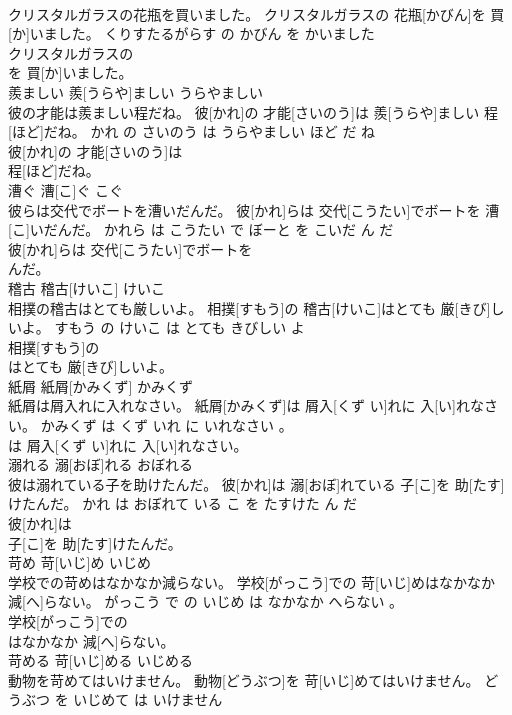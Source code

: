 \documentclass[8pt]{extreport}
\begin{document}
\begin{CJK}{UTF8}{min}
\\	クリスタルガラスの花瓶を買いました。	クリスタルガラスの 花瓶[かびん]を 買[か]いました。	くりすたるがらす の かびん を かいました	
\\	クリスタルガラスの
\\	を 買[か]いました。			
\\	羨ましい	羨[うらや]ましい	うらやましい	
\\	彼の才能は羨ましい程だね。	彼[かれ]の 才能[さいのう]は 羨[うらや]ましい 程[ほど]だね。	かれ の さいのう は うらやましい ほど だ ね	
\\	彼[かれ]の 才能[さいのう]は
\\	程[ほど]だね。			
\\	漕ぐ	漕[こ]ぐ	こぐ	
\\	彼らは交代でボートを漕いだんだ。	彼[かれ]らは 交代[こうたい]でボートを 漕[こ]いだんだ。	かれら は こうたい で ぼーと を こいだ ん だ	
\\	彼[かれ]らは 交代[こうたい]でボートを
\\	んだ。			
\\	稽古	稽古[けいこ]	けいこ	
\\	相撲の稽古はとても厳しいよ。	相撲[すもう]の 稽古[けいこ]はとても 厳[きび]しいよ。	すもう の けいこ は とても きびしい よ	
\\	相撲[すもう]の
\\	はとても 厳[きび]しいよ。			
\\	紙屑	紙屑[かみくず]	かみくず	
\\	紙屑は屑入れに入れなさい。	紙屑[かみくず]は 屑入[くず い]れに 入[い]れなさい。	かみくず は くず いれ に いれなさい 。	
\\	は 屑入[くず い]れに 入[い]れなさい。			
\\	溺れる	溺[おぼ]れる	おぼれる	
\\	彼は溺れている子を助けたんだ。	彼[かれ]は 溺[おぼ]れている 子[こ]を 助[たす]けたんだ。	かれ は おぼれて いる こ を たすけた ん だ	
\\	彼[かれ]は
\\	子[こ]を 助[たす]けたんだ。			
\\	苛め	苛[いじ]め	いじめ	
\\	学校での苛めはなかなか減らない。	学校[がっこう]での 苛[いじ]めはなかなか 減[へ]らない。	がっこう で の いじめ は なかなか へらない 。	
\\	学校[がっこう]での
\\	はなかなか 減[へ]らない。			
\\	苛める	苛[いじ]める	いじめる	
\\	動物を苛めてはいけません。	動物[どうぶつ]を 苛[いじ]めてはいけません。	どうぶつ を いじめて は いけません	

\end{CJK}
\end{document}
